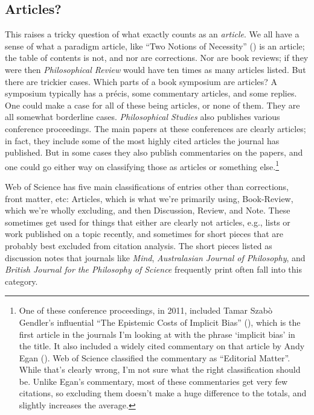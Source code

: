 \documentclass[
  10pt,
  letterpaper,
  DIV=11,
  numbers=noendperiod,
  twoside]{scrartcl}
\begin{document}
\subsection{Articles?}\label{sec-what-is-article}

This raises a tricky question of what exactly counts as an
\emph{article}. We all have a sense of what a paradigm article, like
``Two Notions of Necessity'' () is an article; the table of contents is not, and
nor are corrections. Nor are book reviews; if they were then
\emph{Philosophical Review} would have ten times as many articles
listed. But there are trickier cases. Which parts of a book symposium
are articles? A symposium typically has a précis, some commentary
articles, and some replies. One could make a case for all of these being
articles, or none of them. They are all somewhat borderline cases.
\emph{Philosophical Studies} also publishes various conference
proceedings. The main papers at these conferences are clearly articles;
in fact, they include some of the most highly cited articles the journal
has published. But in some cases they also publish commentaries on the
papers, and one could go either way on classifying those as articles or
something else.\footnote{One of these conference proceedings, in 2011,
  included Tamar Szabò Gendler's influential ``The Epistemic Costs of
  Implicit Bias'' (),
  which is the first article in the journals I'm looking at with the
  phrase `implicit bias' in the title. It also included a widely cited
  commentary on that article by Andy Egan
  (). Web of Science classified the
  commentary as ``Editorial Matter''. While that's clearly wrong, I'm
  not sure what the right classification should be. Unlike Egan's
  commentary, most of these commentaries get very few citations, so
  excluding them doesn't make a huge difference to the totals, and
  slightly increases the average.}

Web of Science has five main classifications of entries other than
corrections, front matter, etc: Articles, which is what we're primarily
using, Book-Review, which we're wholly excluding, and then Discussion,
Review, and Note. These sometimes get used for things that either are
clearly not articles, e.g., lists or work published on a topic recently,
and sometimes for short pieces that are probably best excluded from
citation analysis. The short pieces listed as discussion notes that
journals like \emph{Mind}, \emph{Australasian Journal of Philosophy},
and \emph{British Journal for the Philosophy of Science} frequently
print often fall into this category.
\end{document}
